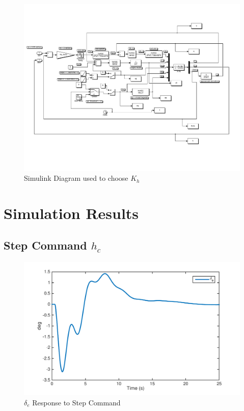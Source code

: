 \documentclass[12pt]{article}
\begin{document}
\begin{figure}[h!]
\begin{center}
\includegraphics[width=.95\textwidth]{figures/Kp_h_gain}
\caption{Simulink Diagram used to choose $K_{h}$}
\end{center}
\end{figure}

\clearpage
\section{Simulation Results}
\subsection{Step Command $h_c$}
\begin{figure}[h!]
\begin{center}
\includegraphics[height=.36\textheight]{figures/2_de}
\caption{$\delta_e$ Response to Step Command}
\end{center}
\end{figure}
\end{document}
